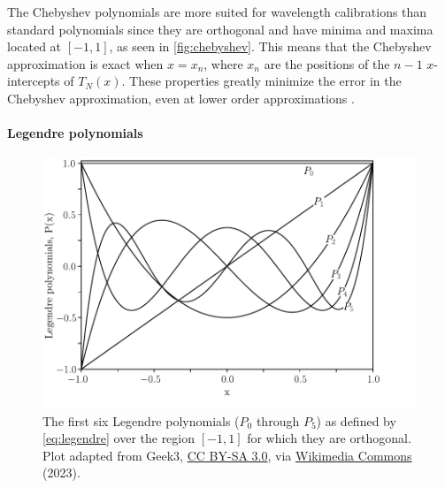 

The Chebyshev polynomials are more suited for wavelength calibrations than standard polynomials since they are orthogonal and have minima and maxima located at $[-1, 1]$, as seen in \autoref{fig:chebyshev}. This means that the Chebyshev approximation is exact when $x = x_{n}$, where $x_{n}$ are the positions of the $n - 1$ $x$-intercepts of $T_{N}(x)$. These properties greatly minimize the error in the Chebyshev approximation, even at lower order approximations \citep{cheby}.


\paragraph{Legendre polynomials}

\begin{figure}[t]
    \centering
    \includegraphics[width = 12cm]{figures/2_legendre.pdf}
    \caption{The first six Legendre polynomials ($P_0$ through $P_{5}$) as defined by \autoref{eq:legendre} over the region $[-1, 1]$ for which they are orthogonal. Plot adapted from Geek3, \protect\href{https://creativecommons.org/licenses/by-sa/3.0}{CC BY-SA 3.0}, via \protect\href{https://commons.wikimedia.org/wiki/File:Legendrepolynomials6.svg}{Wikimedia Commons} (2023).}
    \label{fig:legendre}
\end{figure}


